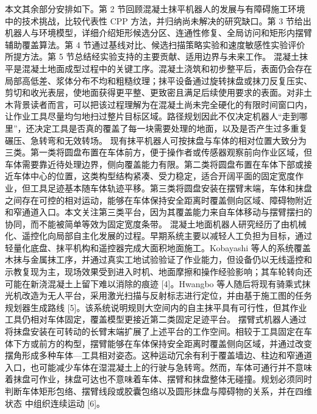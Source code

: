 {}本文其余部分安排如下。第 2 节回顾混凝土抹平机器人的发展与有障碍施工环境中的技术挑战，比较代表性 CPP 方法，并归纳尚未解决的研究缺口。第 3 节给出机器人与环境模型，详细介绍矩形候选分区、连通性修复、全局访问和矩形内摆臂辅助覆盖算法。第 4 节通过基线对比、候选扫描策略实验和速度敏感性实验评价所提方法。第 5 节总结经实验支持的主要贡献、适用边界与未来工作。\markdownRendererParagraphSeparator
{}
\markdownRendererSectionEnd \markdownRendererSectionBegin
{}\markdownRendererParagraphSeparator
{}\markdownRendererSectionBegin
{}\markdownRendererParagraphSeparator
{}混凝土抹平是混凝土地面成型过程中的关键工序。混凝土浇筑和初步整平后，表面仍会存在局部高低差、浆体分布不均和粗糙纹理；抹平设备通过旋转抹盘或抹刀反复压实、剪切和收光表层，使地面获得更平整、更致密且满足后续使用要求的表面。对非土木背景读者而言，可以把该过程理解为在混凝土尚未完全硬化的有限时间窗口内，让作业工具尽量均匀地扫过整片目标区域。路径规划因此不仅决定机器人“走到哪里”，还决定工具是否真的覆盖了每一块需要处理的地面，以及是否产生过多重复碾压、急转弯和无效转场。\markdownRendererParagraphSeparator
{}现有抹平机器人可按抹盘与车体的相对位置大致分为三类。第一类将圆盘布置在车体前方，便于操作者或传感器观察前向作业区域，但车体需要靠近待处理边界，侧向覆盖能力有限。第二类将圆盘布置在车体下部或接近车体中心的位置，这类构型结构紧凑、受力稳定，适合开阔平面的固定宽度作业，但工具足迹基本随车体轨迹平移。第三类将圆盘安装在摆臂末端，车体和抹盘之间存在可控的相对运动，能够在车体保持安全距离时覆盖侧向区域、障碍物附近和窄通道入口。本文关注第三类平台，因为其覆盖能力来自车体移动与摆臂摆扫的协同，而不能被简单等效为固定宽度条带。\markdownRendererParagraphSeparator
{}\markdownRendererParagraphSeparator
{}混凝土地面机器人研究经历了由机械化、遥控化向局部自主化发展的过程。早期系统主要以减轻人工负担为目标，通过轻量化底盘、抹平机构和遥控器完成大面积地面施工。Kobayashi 等人的系统覆盖木抹与金属抹工序，并通过真实工地试验验证了作业能力，但设备仍以无线遥控和示教复现为主，现场效果受到进入时机、地面摩擦和操作经验影响；其车轮转向还可能在新浇混凝土上留下难以消除的痕迹 [4]。Hwangbo 等人随后将现有骑乘式抹光机改造为无人平台，采用激光扫描与反射标志进行定位，并由基于施工图的任务规划器生成路线 [5]。该系统说明规则大空间内的自主抹平具有可行性，但其作业工具仍相对车体固定，覆盖模型更接近第二类固定足迹平台。\markdownRendererParagraphSeparator
{}摆臂式机器人通过将抹盘安装在可转动的长臂末端扩展了上述平台的工作空间。相较于工具固定在车体下方或前方的构型，摆臂能够在车体保持安全距离时覆盖侧向区域，并通过改变摆角形成多种车体—工具相对姿态。这种运动冗余有利于覆盖墙边、柱边和窄通道入口，也可能减少车体在湿混凝土上的行驶与急转弯。然而，车体可通行并不意味着抹盘可作业，抹盘可达也不意味着车体、摆臂和抹盘整体无碰撞。规划必须同时判断车体矩形包络、摆臂线段或胶囊包络以及圆形抹盘与障碍物的关系，并在四维状态  中组织连续运动 [6]。\markdownRendererParagraphSeparator
